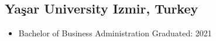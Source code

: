 \documentclass[11pt]{article}
\newcommand{\rside}[1]{
              \hfill {\normalfont\color{accent} #1}%
          }
\begin{document}
                                                                                      \subsection{Yaşar University \rside{Izmir, Turkey}}
                                                                                      \begin{itemize}
                                                                                                  \item{Bachelor of Business Administration \rside{Graduated: 2021}}
                                                                                      \end{itemize}
                                                                                  
\end{document}
